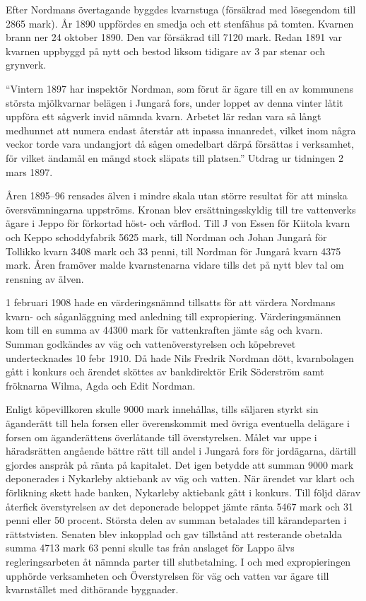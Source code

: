 Efter Nordmans övertagande byggdes kvarnstuga (försäkrad med lösegendom till 2865 mark). År 1890 uppfördes en smedja och ett stenfähus på tomten. Kvarnen brann ner 24 oktober 1890. Den var försäkrad till 7120 mark. Redan 1891 var kvarnen uppbyggd på nytt och bestod liksom tidigare av 3 par stenar och grynverk.

``Vintern 1897 har inspektör Nordman, som förut är ägare till en av kommunens största mjölkvarnar belägen i Jungarå fors, under loppet av denna vinter låtit uppföra ett sågverk invid nämnda kvarn. Arbetet lär redan vara så långt medhunnet att numera endast återstår att inpassa innanredet, vilket inom några veckor torde vara undangjort	då sågen omedelbart därpå försättas i verksamhet, för vilket ändamål en mängd stock släpats till platsen.'' Utdrag ur tidningen 2 mars 1897.

Åren 1895--96 rensades älven i mindre skala utan större resultat för att minska översvämningarna uppströms. Kronan blev ersättningsskyldig till tre vattenverks ägare i Jeppo för förkortad höst- och vårflod. Till J von Essen för Kiitola kvarn och Keppo schoddyfabrik 5625 mark, till Nordman och Johan Jungarå för Tollikko kvarn 3408 mark och 33 penni, till Nordman för Jungarå kvarn 4375 mark. Åren framöver malde kvarnstenarna vidare tills det på nytt blev tal om rensning av älven.


1 februari 1908 hade en värderingsnämnd tillsatts för att värdera Nordmans kvarn- och såganläggning med anledning till expropiering. Värderingsmännen kom till en summa av 44300 mark för vattenkraften jämte såg och kvarn. Summan godkändes av väg och vattenöverstyrelsen och köpebrevet undertecknades 10 febr 1910. Då hade Nils Fredrik Nordman dött, kvarnbolagen gått i konkurs och ärendet sköttes av bankdirektör Erik Söderström samt fröknarna Wilma, Agda och Edit Nordman.

Enligt köpevillkoren skulle 9000 mark innehållas, tills säljaren styrkt sin äganderätt till hela forsen eller överenskommit med övriga eventuella delägare i forsen om äganderättens överlåtande till överstyrelsen. Målet var uppe i häradsrätten angående bättre rätt till andel i Jungarå fors för jordägarna, därtill gjordes anspråk på ränta på kapitalet. Det igen betydde att summan 9000 mark deponerades i Nykarleby aktiebank av väg och vatten. När ärendet var klart och förlikning skett hade banken, Nykarleby aktiebank gått i konkurs. Till följd därav återfick överstyrelsen av det deponerade beloppet jämte ränta 5467 mark och 31 penni eller 50 procent. Största delen av summan betalades till kärandeparten i rättstvisten. Senaten blev inkopplad och gav tillstånd att resterande obetalda summa 4713 mark 63 penni skulle tas från anslaget för Lappo älvs regleringsarbeten åt nämnda parter till slutbetalning. I och med expropieringen upphörde verksamheten och Överstyrelsen för väg och vatten var ägare till kvarnstället med dithörande byggnader.

